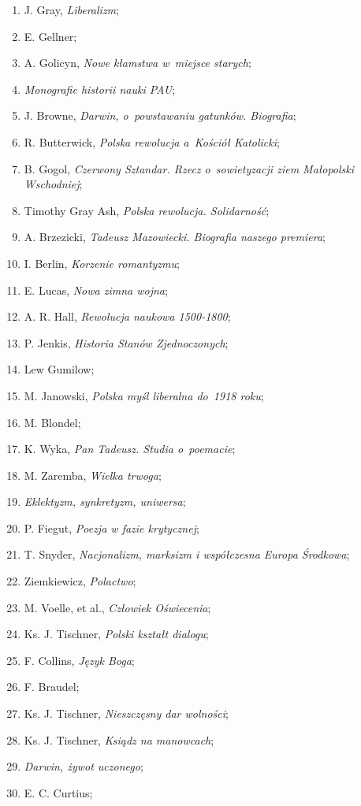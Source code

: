 \documentclass[a4paper,11pt]{article}
\begin{document}
\begin{enumerate}
\item J. Gray, \emph{Liberalizm};
\item E. Gellner;
\item A. Golicyn, \emph{Nowe kłamstwa w~miejsce starych};
\item \emph{Monografie historii nauki PAU};
\item J. Browne, \emph{Darwin, o~powstawaniu gatunków. Biografia};
\item R. Butterwick, \emph{Polska rewolucja a~Kościół Katolicki};
\item B. Gogol, \emph{Czerwony Sztandar. Rzecz o~sowietyzacji ziem
    Małopolski Wschodniej};
\item Timothy Gray Ash, \emph{Polska rewolucja. Solidarność};
\item A. Brzezicki, \emph{Tadeusz Mazowiecki. Biografia naszego
    premiera};
\item I. Berlin, \emph{Korzenie romantyzmu};
\item E. Lucas, \emph{Nowa zimna wojna};
\item A. R. Hall, \emph{Rewolucja naukowa 1500-1800};
\item P. Jenkis, \emph{Historia Stanów Zjednoczonych};
\item Lew Gumilow;
\item M. Janowski, \emph{Polska myśl liberalna do~1918 roku};
\item M. Blondel;
\item K. Wyka, \emph{Pan Tadeusz. Studia o~poemacie};
\item M. Zaremba, \emph{Wielka trwoga};
\item \emph{Eklektyzm, synkretyzm, uniwersa};
\item P. Fiegut, \emph{Poezja w fazie krytycznej};
\item T. Snyder, \emph{Nacjonalizm, marksizm i współczesna Europa
    Środkowa};
\item Ziemkiewicz, \emph{Polactwo};
\item M. Voelle, et al., \emph{Człowiek Oświecenia};
\item Ks. J. Tischner, \emph{Polski kształt dialogu};
\item F. Collins, \emph{Język Boga};
\item F. Braudel;
\item Ks. J. Tischner, \emph{Nieszczęsny dar wolności};
\item Ks. J. Tischner, \emph{Ksiądz na manowcach};
\item \emph{Darwin, żywot uczonego};
\item E. C. Curtius;

\end{enumerate}
\end{document}
